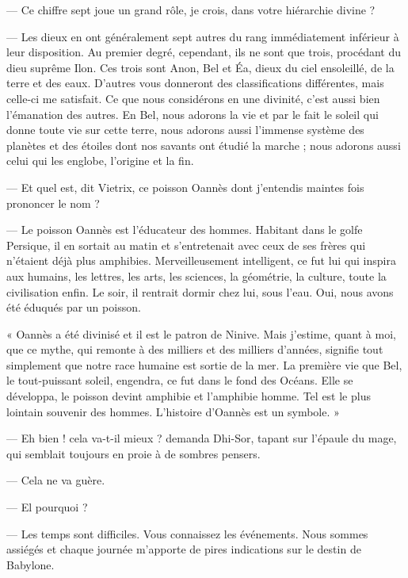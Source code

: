 \documentclass[a4paper, 11pt, oneside, polutonikogreek, french]{article}
\begin{document}
--- Ce chiffre sept joue un grand rôle, je crois, dans votre hiérarchie divine ?

--- Les dieux en ont généralement sept autres du rang immédiatement inférieur à leur disposition. Au premier degré, cependant, ils ne sont que trois, procédant du dieu suprême Ilon. Ces trois sont Anon, Bel et Éa, dieux du ciel ensoleillé, de la terre et des eaux. D'autres vous donneront des classifications différentes, mais celle-ci me satisfait. Ce que nous considérons en une divinité, c'est aussi bien l'émanation des autres. En Bel, nous adorons la vie et par le fait le soleil qui donne toute vie sur cette terre, nous adorons aussi l'immense système des planètes et des étoiles dont nos savants ont étudié la marche ; nous adorons aussi celui qui les englobe, l'origine et la fin.

\bigskip
\centerline{\EightStarTaper}
\centerline{\EightStarTaper\EightStarTaper}
\bigskip

--- Et quel est, dit Vietrix, ce poisson Oannès dont j'entendis maintes fois prononcer le nom ?

--- Le poisson Oannès est l'éducateur des hommes. Habitant dans le golfe Persique, il en sortait au matin et s'entretenait avec ceux de ses frères qui n'étaient déjà plus amphibies. Merveilleusement intelligent, ce fut lui qui inspira aux humains, les lettres, les arts, les sciences, la géométrie, la culture, toute la civilisation enfin. Le soir, il rentrait dormir chez lui, sous l'eau. Oui, nous avons été éduqués par un poisson.

« Oannès a été divinisé et il est le patron de Ninive. Mais j'estime, quant à moi, que ce mythe, qui remonte à des milliers et des milliers d'années, signifie tout simplement que notre race humaine est sortie de la mer. La première vie que Bel, le tout-puissant soleil, engendra, ce fut dans le fond des Océans. Elle se développa, le poisson devint amphibie et l'amphibie homme. Tel est le plus lointain souvenir des hommes. L'histoire d'Oannès est un symbole. »

\bigskip
\centerline{\EightStarTaper}
\centerline{\EightStarTaper\EightStarTaper}
\bigskip

--- Eh bien ! cela va-t-il mieux ? demanda Dhi-Sor, tapant sur l'épaule du mage, qui semblait toujours en proie à de sombres pensers.

--- Cela ne va guère.

--- El pourquoi ?

--- Les temps sont difficiles. Vous connaissez les événements. Nous sommes assiégés et chaque journée m'apporte de pires indications sur le destin de Babylone.
\end{document}
